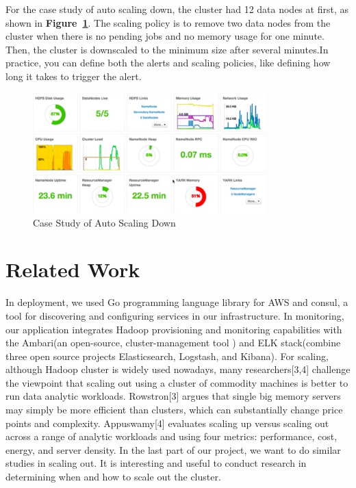 \documentclass{article}
\begin{document}
For the case study of auto scaling down, the cluster had 12 data nodes at first, as shown in \textbf{Figure~\ref{fig:autoscalingdown}}. The scaling policy is to remove two data nodes from the cluster when there is no pending jobs and no memory usage for one minute. Then, the cluster is downscaled to the minimum size after several minutes.In practice, you can define both the alerts and scaling policies, like defining how long it takes to trigger the alert.
\begin{figure}[ht!]
 \centering
 \includegraphics[width=0.8\textwidth,natwidth=1000,natheight=800]{caseScaleDown.png}
 \caption{Case Study of Auto Scaling Down}
 \label{fig:autoscalingdown}
 \end{figure}
 
\section{Related Work}
In deployment, we used Go programming language library for AWS and consul, a tool for discovering and configuring services in our infrastructure. In monitoring, our application integrates Hadoop provisioning and monitoring capabilities with the Ambari(an open-source, cluster-management tool ) and ELK stack(combine three open source projects Elasticsearch, Logstash, and Kibana). For scaling, although Hadoop cluster is widely used nowadays, many researchers[3,4] challenge the viewpoint that scaling out using a cluster of commodity machines is better to run data analytic workloads. Rowstron[3] argues that single big memory servers may simply be more efficient than clusters, which can substantially change price points and complexity.  Appuswamy[4] evaluates scaling up versus scaling out across a range of analytic workloads and using four metrics: performance, cost, energy, and server density. In the last part of our project, we want to do similar studies in scaling out. It is interesting and useful to conduct research in determining when and how to scale out the cluster.
\end{document}
